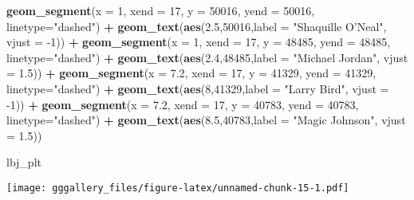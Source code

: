 \documentclass[]{book}
\newenvironment{Shaded}{\begin{snugshade}}{\end{snugshade}}
\newcommand{\DataTypeTok}[1]{\textcolor[rgb]{0.13,0.29,0.53}{#1}}
\newcommand{\DecValTok}[1]{\textcolor[rgb]{0.00,0.00,0.81}{#1}}
\newcommand{\FloatTok}[1]{\textcolor[rgb]{0.00,0.00,0.81}{#1}}
\newcommand{\KeywordTok}[1]{\textcolor[rgb]{0.13,0.29,0.53}{\textbf{#1}}}
\newcommand{\NormalTok}[1]{#1}
\newcommand{\OperatorTok}[1]{\textcolor[rgb]{0.81,0.36,0.00}{\textbf{#1}}}
\newcommand{\StringTok}[1]{\textcolor[rgb]{0.31,0.60,0.02}{#1}}
\begin{document}
\begin{Shaded}
\begin{Highlighting}[]
\StringTok{  }\KeywordTok{geom_segment}\NormalTok{(}\DataTypeTok{x =} \DecValTok{1}\NormalTok{, }\DataTypeTok{xend =} \DecValTok{17}\NormalTok{, }\DataTypeTok{y =} \DecValTok{50016}\NormalTok{, }\DataTypeTok{yend =} \DecValTok{50016}\NormalTok{, }\DataTypeTok{linetype=}\StringTok{"dashed"}\NormalTok{) }\OperatorTok{+}\StringTok{ }
\StringTok{  }\KeywordTok{geom_text}\NormalTok{(}\KeywordTok{aes}\NormalTok{(}\FloatTok{2.5}\NormalTok{,}\DecValTok{50016}\NormalTok{,}\DataTypeTok{label =} \StringTok{"Shaquille O'Neal"}\NormalTok{, }\DataTypeTok{vjust =} \DecValTok{-1}\NormalTok{)) }\OperatorTok{+}
\StringTok{  }\KeywordTok{geom_segment}\NormalTok{(}\DataTypeTok{x =} \DecValTok{1}\NormalTok{, }\DataTypeTok{xend =} \DecValTok{17}\NormalTok{, }\DataTypeTok{y =} \DecValTok{48485}\NormalTok{, }\DataTypeTok{yend =} \DecValTok{48485}\NormalTok{, }\DataTypeTok{linetype=}\StringTok{"dashed"}\NormalTok{) }\OperatorTok{+}\StringTok{ }
\StringTok{  }\KeywordTok{geom_text}\NormalTok{(}\KeywordTok{aes}\NormalTok{(}\FloatTok{2.4}\NormalTok{,}\DecValTok{48485}\NormalTok{,}\DataTypeTok{label =} \StringTok{"Michael Jordan"}\NormalTok{, }\DataTypeTok{vjust =} \FloatTok{1.5}\NormalTok{)) }\OperatorTok{+}
\StringTok{  }\KeywordTok{geom_segment}\NormalTok{(}\DataTypeTok{x =} \FloatTok{7.2}\NormalTok{, }\DataTypeTok{xend =} \DecValTok{17}\NormalTok{, }\DataTypeTok{y =} \DecValTok{41329}\NormalTok{, }\DataTypeTok{yend =} \DecValTok{41329}\NormalTok{, }\DataTypeTok{linetype=}\StringTok{"dashed"}\NormalTok{) }\OperatorTok{+}\StringTok{ }
\StringTok{  }\KeywordTok{geom_text}\NormalTok{(}\KeywordTok{aes}\NormalTok{(}\DecValTok{8}\NormalTok{,}\DecValTok{41329}\NormalTok{,}\DataTypeTok{label =} \StringTok{"Larry Bird"}\NormalTok{, }\DataTypeTok{vjust =} \DecValTok{-1}\NormalTok{)) }\OperatorTok{+}
\StringTok{  }\KeywordTok{geom_segment}\NormalTok{(}\DataTypeTok{x =} \FloatTok{7.2}\NormalTok{, }\DataTypeTok{xend =} \DecValTok{17}\NormalTok{, }\DataTypeTok{y =} \DecValTok{40783}\NormalTok{, }\DataTypeTok{yend =} \DecValTok{40783}\NormalTok{, }\DataTypeTok{linetype=}\StringTok{"dashed"}\NormalTok{) }\OperatorTok{+}
\StringTok{  }\KeywordTok{geom_text}\NormalTok{(}\KeywordTok{aes}\NormalTok{(}\FloatTok{8.5}\NormalTok{,}\DecValTok{40783}\NormalTok{,}\DataTypeTok{label =} \StringTok{"Magic Johnson"}\NormalTok{, }\DataTypeTok{vjust =} \FloatTok{1.5}\NormalTok{)) }

\NormalTok{lbj_plt}
\end{Highlighting}
\end{Shaded}

\texttt{[image: gggallery\_files/figure-latex/unnamed-chunk-15-1.pdf]}
\end{document}
